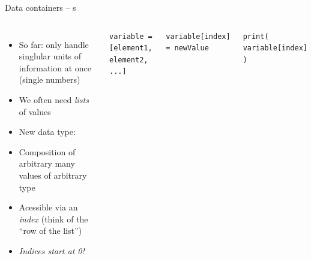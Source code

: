 
\begin{frame}[fragile]{Data containers -- s}
%
\begin{columns}
\begin{itemize}
\item So far: only handle singlular units of information at once (single numbers)
\item We often need \emph{lists} of values
\item New data type: 
\item Composition of arbitrary many values of arbitrary type
\item Acessible via an \emph{index} (think of the \enquote{row of the list})
\item \emph{Indices start at 0!}
\end{itemize}
%
\begin{codebox}
\begin{verbatim}
variable = [element1, element2, ...]
\end{verbatim}
\end{codebox}
%
\begin{codebox}
\begin{verbatim}
variable[index] = newValue
\end{verbatim}
\end{codebox}
%
\begin{codebox}
\begin{verbatim}
print( variable[index] )
\end{verbatim}
\end{codebox}
\end{columns}
%
\end{frame}


